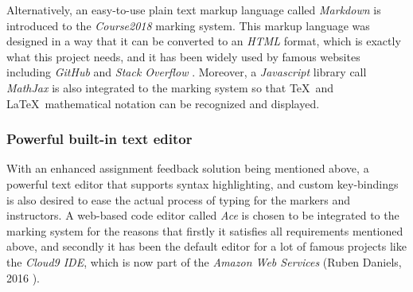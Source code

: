 Alternatively, an easy-to-use plain text markup language called \emph{Markdown}
is introduced to the \emph{Course2018} marking system. This markup language was
designed in a way that it can be converted to an \emph{HTML} format, which is
exactly what this project needs, and it has been
widely used by famous websites including \emph{GitHub} \cite{gitHubMarkdown}
and \emph{Stack Overflow} \cite{stackOverflowMarkdown}.
Moreover, a \emph{Javascript} library call \emph{MathJax} is also integrated
to the marking system so that \TeX\ and \LaTeX\ mathematical notation can be
recognized and displayed.

\subsubsection{Powerful built-in text editor}
With an enhanced assignment feedback solution being mentioned above, a powerful
text editor that supports syntax highlighting, and custom key-bindings is also
desired to ease the actual process of typing for the markers and instructors.
A web-based code editor called \emph{Ace} \cite{aceEditor} is chosen to be
integrated to the marking system for the reasons that firstly it satisfies all
requirements mentioned above, and secondly it has been the default editor for a
lot of famous projects like the \emph{Cloud9 IDE}, which is now part of the
\emph{Amazon Web Services} (Ruben Daniels, 2016 \cite{cloud9}).